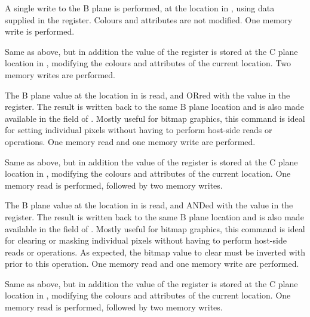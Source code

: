 \begin{description}
   A single write to the B plane is
  performed, at the location in , using data supplied in the
   register. Colours and attributes are not modified. One memory
  write is performed.

   Same as above, but in addition the
  value of the  register is stored at the C plane location in
  , modifying the colours and attributes of the current location. Two
  memory writes are performed.

   The B plane value at the
  location in  is read, and ORred with the value in the 
  register. The result is written back to the same B plane location and is also
  made available in the  field of . Mostly useful for
  bitmap graphics, this command is ideal for setting individual pixels without
  having to perform host-side reads or  operations. One memory read and
  one memory write are performed.

   Same as
  above, but in addition the value of the  register is stored at
  the C plane location in , modifying the colours and attributes of
  the current location. One memory read is performed, followed by
  two memory writes.

   The B plane value at
  the location in  is read, and ANDed with the value in the
   register. The result is written back to the same B plane location
  and is also made available in the  field of . Mostly
  useful for bitmap graphics, this command is ideal for clearing or masking
  individual pixels without having to perform host-side reads or 
  operations. As expected, the bitmap value to clear must be inverted with
   prior to this operation. One memory read and one memory write are
  performed.

   Same
  as above, but in addition the value of the  register is stored at
  the C plane location in , modifying the colours and attributes of
  the current location. One memory read is performed, followed by
  two memory writes.


\end{description}
